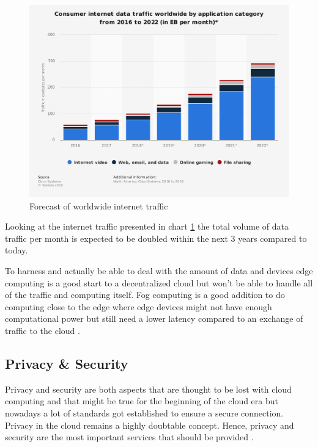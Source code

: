 \begin{figure}[H]
    \centering
    \includegraphics[width=1\textwidth]{resources/images/global_traffic.png}
    \caption{Forecast of worldwide internet traffic}
    \label{fig:global_traffic}
\end{figure}

Looking at the internet traffic presented in chart \ref{fig:global_traffic} the total volume of data traffic per month is expected to be doubled within the next 3 years compared to today.

To harness and actually be able to deal with the amount of data and devices edge computing is a good start to a decentralized cloud but won’t be able to handle all of the traffic and computing itself. Fog computing is a good addition to do computing close to the edge where edge devices might not have enough computational power but still need a lower latency compared to an exchange of traffic to the cloud \cite{7796149}.

\subsection{Privacy \& Security}
Privacy and security are both aspects that are thought to be lost with cloud computing and that might be true for the beginning of the cloud era but nowadays a lot of standards got established to ensure a secure connection. Privacy in the cloud remains a highly doubtable concept. Hence, privacy and security are the most important services that should be provided \cite{GarciaLopez:2015:ECV:2831347.2831354}.


